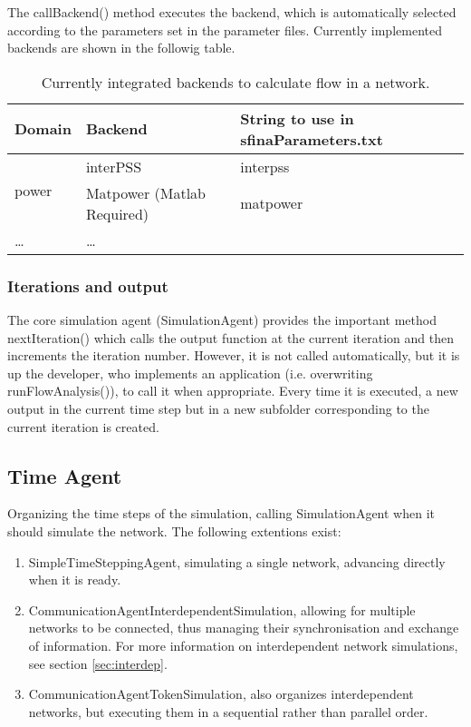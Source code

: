 \documentclass[11pt,fleqn]{book} %
\newcommand{\mainagent}{simulation agent }
\newcommand{\TimeAgent}{Time Agent }
\begin{document}
The callBackend() method executes the backend, which is automatically selected according to the parameters set in the parameter files. Currently implemented backends are shown in the followig table.
\begin{table}[h]
	\centering
	\begin{tabular}{|l| l |l|}
	\hline
	\rowcolor{Gray}
	\textbf{Domain}&\textbf{Backend}&\textbf{String to use in sfinaParameters.txt}\\
	\hline
	\multirow{2}{*}{power}&interPSS & interpss\\
	\cline{2-3}
	& Matpower (Matlab Required)& matpower\\
	\hline
	\dots & \dots & \\
	\hline
	\end{tabular}
	\label{table:backends}
	\caption{Currently integrated backends to calculate flow in a network.}
\end{table}

\subsubsection{Iterations and output}
The core \mainagent (SimulationAgent) provides the important method nextIteration() which calls the output function at the current iteration and then increments the iteration number. However, it is not called automatically, but it is up the developer, who implements an application (i.e. overwriting runFlowAnalysis()), to call it when appropriate. Every time it is executed, a new output in the current time step but in a new subfolder corresponding to the current iteration is created.

\subsection{\TimeAgent}\index{Agent!\TimeAgent}\label{sec:time_agent}
Organizing the time steps of the simulation, calling SimulationAgent when it should simulate the network. The following extentions exist:
	\begin{enumerate}
		\item SimpleTimeSteppingAgent, simulating a single network, advancing directly when it is ready.
		\item CommunicationAgentInterdependentSimulation, allowing for multiple networks to be connected, thus managing their synchronisation and exchange of information. For more information on interdependent network simulations, see section \ref{sec:interdep}.
		\item CommunicationAgentTokenSimulation, also organizes interdependent networks, but executing them in a sequential rather than parallel order.
	\end{enumerate}
	
\end{document}
